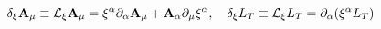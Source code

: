 \begin{equation}
\delta _{\xi }{\bf A}_{\mu }\equiv {\cal L}_{\xi }{\bf A}_{\mu }=\xi
^{\alpha }\partial _{\alpha }{\bf A}_{\mu }+{\bf A}_{\alpha }
\partial _{\mu}\xi ^{\alpha },\ \ \ \delta _{\xi }L_{T}\equiv
{\cal L}_{\xi}L_{T}=\partial _{\alpha }(\xi ^{\alpha }L_{T})
\label{eqn:18}\end{equation} 
